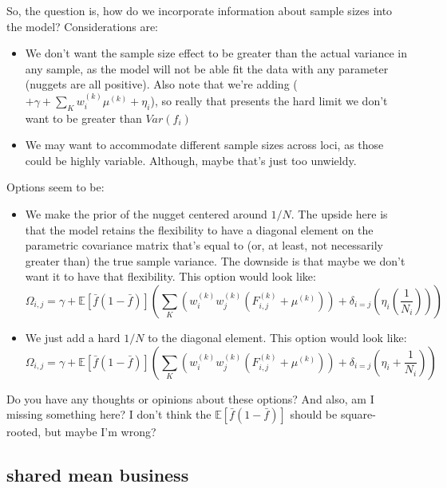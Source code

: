 \documentclass[12pt]{article}
\newcommand{\e}[1]{{\mathbb E}\left[ #1 \right]}
\begin{document}
{\begin{itemize}
So, the question is, how do we incorporate information about sample sizes 
into the model?  Considerations are: 
\begin{itemize}
\item We don't want the sample size effect 
to be greater than the actual variance in any sample, 
as the model will not be able fit the data with any parameter 
(nuggets are all positive).  Also note that we're adding 
($+ \gamma + \sum\limits_{K}w^{(k)}_i\mu^{(k)} + \eta_{i}$),
so really that presents the hard limit we don't want to be greater than 
$Var(f_{i})$
\item We may want to accommodate different sample sizes 
across loci, as those could be highly variable.  Although, maybe that's 
just too unwieldy.
\end{itemize}
Options seem to be:
\begin{itemize}
\item We make the prior of the nugget centered around $1/N$.  The upside 
here is that the model retains the flexibility to have a diagonal element on the 
parametric covariance matrix that's equal to (or, at least, not necessarily greater 
than) the true sample variance.  The downside is that maybe we don't want it to have 
that flexibility.  This option would look like:
\begin{equation}
\Omega_{i,j} = \gamma + 
			\e{\bar{f}(1-\bar{f})} 
			\left( 
			\sum\limits_{K}
				\left(w^{(k)}_{i}w^{(k)}_{j}\left( F^{(k)}_{i,j} + 
				\mu^{(k)} \right)\right) + 
			\delta_{i=j} \left(\eta_i(\frac{1}{N_{i}})\right)
			\right) 
\end{equation}
\item We just add a hard $1/N$ to the diagonal element.
This option would look like:
\begin{equation}
\Omega_{i,j} = \gamma + 
			\e{\bar{f}(1-\bar{f})}
			\left( 
			\sum\limits_{K}
				\left(w^{(k)}_{i}w^{(k)}_{j}\left( F^{(k)}_{i,j} + 
				\mu^{(k)} \right)\right) + 
			\delta_{i=j} \left(\eta_i + \frac{1}{N_{i}}\right)
			\right)
\end{equation}
\end{itemize}
\end{itemize}
Do you have any thoughts or opinions about these options?  
And also, am I missing something here?  I don't think the 
$\e{\bar{f}(1-\bar{f})}$ should be square-rooted, but maybe I'm wrong?
}
\newpage
\subsection*{shared mean business}
\end{document}

